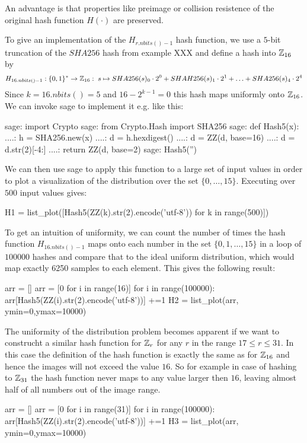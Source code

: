 An advantage is that properties like preimage or collision resistence of the original hash function $H(\cdot)$ are preserved.
\begin{example} To give an implementation of the $H_{r.nbits()-1}$ hash function, we use a $5$-bit truncation of the $SHA256$ hash from example XXX and define a hash into $\mathbb{Z}_{16}$ by
$$
H_{16.nbits()-1}: \{0,1\}^* \to \mathbb{Z}_{16}:\; s\mapsto
SHA256(s)_0\cdot 2^0 + SHAH256(s)_1\cdot 2^1 + \ldots + SHA256(s)_4\cdot 2^4 
$$
Since $k=16.nbits()=5$ and $16-2^{k-1}=0$ this hash maps uniformly onto $\mathbb{Z}_{16}$. We can invoke sage to implement it e.g. like this:
\begin{sagecommandline}
sage: import Crypto 
sage: from Crypto.Hash import SHA256
sage: def Hash5(x):
....:     h = SHA256.new(x)
....:     d = h.hexdigest()
....:     d = ZZ(d, base=16)
....:     d = d.str(2)[-4:]
....:     return ZZ(d, base=2)
sage: Hash5('')
\end{sagecommandline}
We can then use sage to apply this function to a large set of input values in order to plot a visualization of the distribution over the set $\{0,\ldots,15\}$. Executing over $500$ input values gives:
\begin{sagesilent}
H1 = list_plot([Hash5(ZZ(k).str(2).encode('utf-8')) for k in range(500)])
\end{sagesilent}
\begin{center} 
\end{center}
To get an intuition of uniformity, we can count the number of times the hash function $H_{16.nbits()-1}$ maps onto each number in the set $\{0,1,\ldots,15\}$ in a loop of $100000$ hashes and compare that to the ideal uniform distribution, which would map exactly 6250 samples to each element. This gives the following result:
\begin{sagesilent}
arr = []
arr = [0 for i in range(16)]
for i in range(100000):
    arr[Hash5(ZZ(i).str(2).encode('utf-8'))] +=1
H2 = list_plot(arr, ymin=0,ymax=10000)
\end{sagesilent}
\begin{center} 
\end{center}
The uniformity of the distribution problem becomes apparent if we want to construcht a similar hash function for $\mathbb{Z}_r$ for any $r$ in the range $17\leq r \leq 31$. In this case the definition of the hash function is exactly the same as for $\mathbb{Z}_{16}$ and hence the images will not exceed the value $16$. So for example in case of hashing to $\mathbb{Z}_{31}$ the hash function never maps to any value larger then $16$, leaving almost half of all numbers out of the image range.
\begin{sagesilent}
arr = []
arr = [0 for i in range(31)]
for i in range(100000):
    arr[Hash5(ZZ(i).str(2).encode('utf-8'))] +=1
H3 = list_plot(arr, ymin=0,ymax=10000)
\end{sagesilent}
\begin{center} 
\end{center}
\end{example}
 
